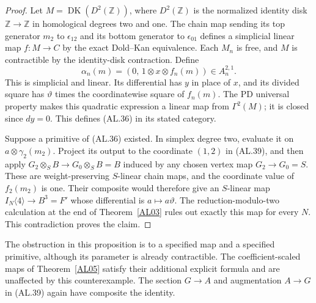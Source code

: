 \begin{proof}
Let $M=\operatorname{DK}(D^2(\mathbb Z))$, where
$D^2(\mathbb Z)$ is the normalized identity disk
$\mathbb Z\to\mathbb Z$ in homological degrees
two and one.  The chain map sending its top
generator $m_2$ to $\epsilon_{12}$ and its bottom
generator to $\epsilon_{01}$ defines a simplicial
linear map $f:M\to C$ by the exact Dold--Kan
equivalence.  Each $M_n$ is free, and $M$ is
contractible by the identity-disk contraction.
Define
\[
 \alpha_n(m)=(0,\,1\otimes x\otimes f_n(m))
                  \in A_n^{2,1}.
 \tag{AL.40}
\]
This is simplicial and linear.  Its differential
has $y$ in place of $x$, and its divided square
has $\vartheta$ times the coordinatewise square
of $f_n(m)$.  The PD universal property makes
this quadratic expression a linear map from
$\Gamma^2(M)$; it is closed since $dy=0$.
This defines \textup{(AL.36)} in its stated category.

Suppose a primitive of \textup{(AL.36)} existed.
In simplex degree two, evaluate it on
$a\otimes\gamma_2(m_2)$.
Project its output to the coordinate $(1,2)$ in
\textup{(AL.39)}, and then apply
$G_2\otimes_SB\to G_0\otimes_SB=B$ induced by
any chosen vertex map $G_2\to G_0=S$.
These are weight-preserving $S$-linear chain maps,
and the coordinate value of $f_2(m_2)$ is one.
Their composite would therefore give an $S$-linear
map $I_N\langle4\rangle\to B^3=F'$ whose differential
is $a\mapsto a\vartheta$.
The reduction-modulo-two calculation at the end of
Theorem~\ref{AL03} rules out exactly this map for
every $N$.  This contradiction proves the claim.
\end{proof}

The obstruction in this proposition is to a specified
map and a specified primitive, although its parameter
is already contractible.  The coefficient-scaled
maps of Theorem~\ref{AL05} satisfy their additional
explicit formula and are unaffected by this
counterexample.  The section $G\to A$ and
augmentation $A\to G$ in \textup{(AL.39)} again
have composite the identity.
